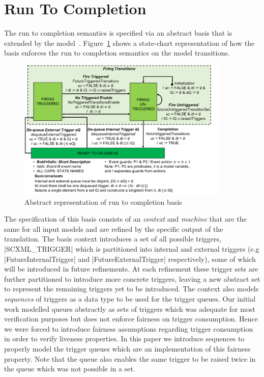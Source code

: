 

\section{Run To Completion}
\label{sec:run-completion}
The run to completion semantics is specified via an abstract basis that is extended by the model~\cite{MoSnHo18,MoSnHo-ABZ2020}. 
Figure~\ref{fig:basis} shows a state-chart representation of how the basis enforces 
the run to completion semantics on the model transitions. 

\begin{figure}[!h]
	\vspace{-.4cm}
	\centering
	\includegraphics[width=0.90\textwidth, trim=30 50 60 0]{figures/Picture6.png}
	\caption{Abstract representation of run to completion basis}
	\label{fig:basis}
	\vspace{-.4cm}
\end{figure}

The specification of this basis consists of an \EVENTB \emph{context} and \emph{machine} that are 
the same for all input models and are refined by the specific output of the translation.  
The basis context introduces a set of all possible triggers, |SCXML_TRIGGER| which is partitioned into internal and external triggers 
(e.g |FutureInternalTrigger| and |FutureExternalTrigger| respectively), 
some of which will be introduced in future refinements. 
At each refinement these trigger sets are further partitioned to introduce more concrete triggers, 
leaving a new abstract set to represent the remaining triggers yet to be introduced. 
The context also models \emph{sequences} of triggers as a data type to be used for the trigger queues.
Our initial work modelled queues abstractly as sets of triggers which was adequate for most verification purposes but does not enforce fairness on trigger consumption. 
Hence we were forced to introduce fairness assumptions regarding trigger consumption in order to verify liveness properties.
In this paper we introduce sequences to properly model the trigger queues which are an implementation of this fairness property. 
Note that the queue also enables the same trigger to be raised twice in the queue which was not possible in a set.


